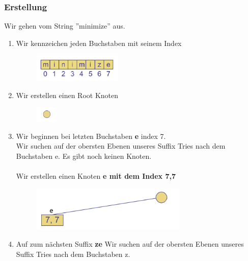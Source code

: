 \documentclass[a4paper,10pt]{report}
\begin{document}
\subsubsection{Erstellung}
Wir gehen vom String ''minimize'' aus.
\begin{enumerate}
	\item
		Wir kennzeichen jeden Buchstaben mit seinem Index
		\begin{figure}[H]
			\begin{center}
  				\includegraphics[width=0.4\textwidth]{img/suffixTrieString.png}
			\end{center}
		\end{figure}
	\item
		Wir erstellen einen Root Knoten
		\begin{figure}[H]
			\begin{center}
  				\includegraphics[width=0.1\textwidth]{img/suffixTrieRoot.png}
			\end{center}
		\end{figure}
	\item
		Wir beginnen bei letzten Buchstaben \textbf{e} index 7.\\
		Wir suchen auf der obersten Ebenen unseres Suffix Tries nach dem Buchstaben e.
		Es gibt noch keinen Knoten.\\
		\\
		Wir erstellen einen Knoten \textbf{e mit dem Index 7,7}
		\begin{figure}[H]
			\begin{center}
  				\includegraphics[width=0.7\textwidth]{img/suffixTrieExample3.png}
			\end{center}
		\end{figure}
	\item
		Auf zum nächsten Suffix \textbf{ze}
		Wir suchen auf der obersten Ebenen unseres Suffix Tries nach dem Buchstaben z.

\end{enumerate}
\end{document}
